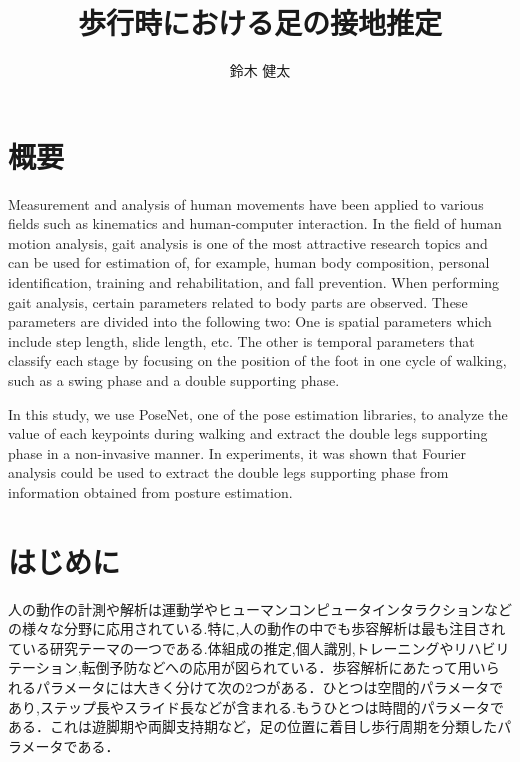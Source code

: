 \documentclass[a4j]{cis-resume}
\title{歩行時における足の接地推定} %
\author{鈴木 健太} %
\begin{document}
\maketitle




\section*{概要}
Measurement and analysis of human movements have been applied to various fields such as kinematics and human-computer interaction. In the field of human motion analysis, gait analysis is one of the most attractive research topics and can be used for estimation of, for example, human body composition, personal identification, training and rehabilitation, and fall prevention. When performing gait analysis, certain parameters related to body parts are observed. These parameters are divided into the following two: One is spatial parameters which include step length, slide length, etc. The other is temporal parameters that classify each stage by focusing on the position of the foot in one cycle of walking, such as a swing phase and a double supporting phase.

In this study, we use PoseNet, one of the pose estimation libraries, to analyze the value of each keypoints during walking and extract the double legs supporting phase in a non-invasive manner. In experiments, it was shown that Fourier analysis could be used to extract the double legs supporting phase from information obtained from posture estimation.

\section{はじめに} \label{sec:introduction}
人の動作の計測や解析は運動学やヒューマンコンピュータインタラクションなどの様々な分野に応用されている.特に,人の動作の中でも歩容解析は最も注目されている研究テーマの一つである.体組成の推定\cite{cite1},個人識別,トレーニングやリハビリテーション,転倒予防などへの応用が図られている．歩容解析にあたって用いられるパラメータには大きく分けて次の2つがある．ひとつは空間的パラメータであり,ステップ長やスライド長などが含まれる.もうひとつは時間的パラメータである．これは遊脚期や両脚支持期\cite{cite2}など，足の位置に着目し歩行周期を分類したパラメータである．
\end{document}
